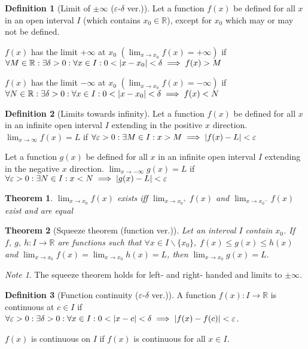 \documentclass{article}
\newcommand*{\R}{\mathbb{R}}
\theoremstyle{plain}
\newtheorem{theorem}{Theorem}[section]
\numberwithin{theorem}{subsection}
\theoremstyle{definition}
\newtheorem{definition}{Definition}[section]
\numberwithin{definition}{subsection}
\theoremstyle{remark}
\newtheorem{note}{Note}[section]
\numberwithin{note}{section}
\begin{document}
%
\begin{definition}[Limit of $\pm\infty$ ($\varepsilon$-$\delta$ ver.)]
    Let a function $f(x)$ be defined for all $x$ in an open interval $I$
    (which contains $x_0 \in \R$), except for $x_0$ which may or may not be defined.

    $f(x)$ has the limit $+\infty$ at $x_0$
    $\left(\displaystyle\lim_{x\to x_0} f(x) = +\infty\right)$ if
    $ \forall M \in \R: \exists\delta>0: \forall x \in I: 0<\abs{x-x_0}<\delta
    \implies f(x) > M $

    $f(x)$ has the limit $-\infty$ at $x_0$
    $\left(\displaystyle\lim_{x\to x_0} f(x) = -\infty\right)$ if
        $\forall N \in \R: \exists\delta>0: \forall x \in I: 0<\abs{x-x_0}<\delta
            \implies f(x) < N$
\end{definition}
%
\begin{definition}[Limits towards infinity]
    Let a function $f(x)$ be defined for all $x$ in an infinite open interval $I$
    extending in the positive $x$ direction.
    $\displaystyle \lim_{x\to\infty} f(x) = L$ if
    $\forall \varepsilon>0: \exists M \in I: x>M
        \implies \abs{f(x)-L}<\varepsilon$

    Let a function $g(x)$ be defined for all $x$ in an infinite open interval $I$
    extending in the negative $x$ direction.
    $\displaystyle \lim_{x\to-\infty} g(x) = L$ if
    $\forall \varepsilon>0: \exists N \in I: x<N
        \implies \abs{g(x)-L}<\varepsilon$
\end{definition}
%
\begin{theorem}
    $\displaystyle\lim_{x\to x_0} f(x)$ exists iff
    $\displaystyle\lim_{x\to {x_0}^+} f(x)$ and $\displaystyle\lim_{x\to {x_0}^-} f(x)$
    exist and are equal
\end{theorem}
%
\begin{theorem}[Squeeze theorem (function ver.)]
    Let an interval $I$ contain $x_0$.
    If $f,\:g,\:h : I \to \R$ are functions such that
    $\forall x \in I\backslash\{x_0\},\; f(x)\leqslant g(x)\leqslant h(x)$
    and
    $\displaystyle\lim_{x\to x_0} f(x) = \lim_{x\to x_0} h(x) = L$,
    then
    $\displaystyle\lim_{x\to x_0} g(x) = L$.
\end{theorem}
%
\begin{note}
   The squeeze theorem holds for left- and right- handed and limits to $\pm\infty$.
\end{note}
%
\begin{definition}[Function continuity ($\varepsilon$-$\delta$ ver.)]
    A function $f(x):I\to\R$ is continuous at $c \in I$ if
    $\forall\varepsilon>0: \exists\delta>0: \forall x\in I:
        0<\abs{x-c}<\delta \implies \abs{f(x)-f(c)}<\varepsilon$.

    $f(x)$ is continuous on $I$ if $f(x)$ is continuous for all $x \in I$.
\end{definition}
\end{document}
